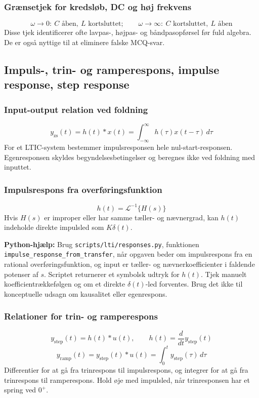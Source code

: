 \subsubsection{Grænsetjek for kredsløb, DC og høj frekvens}
\[
\omega\to0:\ C\text{ åben},\ L\text{ kortsluttet};\qquad
\omega\to\infty:\ C\text{ kortsluttet},\ L\text{ åben}
\]
Disse tjek identificerer ofte lavpas-, højpas- og båndpasopførsel før fuld algebra. De er også nyttige til at eliminere falske MCQ-svar.

\subsection{Impuls-, trin- og ramperespons, impulse response, step response}

\subsubsection{Input-output relation ved foldning}
\[
y_{\mathrm{zs}}(t)=h(t)*x(t)=\int_{-\infty}^{\infty}h(\tau)x(t-\tau)\,d\tau
\]
For et LTIC-system bestemmer impulsresponsen hele nul-start-responsen. Egenresponsen skyldes begyndelsesbetingelser og beregnes ikke ved foldning med inputtet.

\subsubsection{Impulsrespons fra overføringsfunktion}
\[
h(t)=\mathcal{L}^{-1}\{H(s)\}
\]
Hvis \(H(s)\) er improper eller har samme tæller- og nævnergrad, kan \(h(t)\) indeholde direkte impulsled som \(K\delta(t)\).

\textbf{Python-hjælp:} Brug \texttt{scripts/lti/responses.py}, funktionen \texttt{impulse\_response\_from\_transfer}, når opgaven beder om impulsrespons fra en rational overføringsfunktion, og input er tæller- og nævnerkoefficienter i faldende potenser af \(s\). Scriptet returnerer et symbolsk udtryk for \(h(t)\). Tjek manuelt koefficientrækkefølgen og om et direkte \(\delta(t)\)-led forventes. Brug det ikke til konceptuelle udsagn om kausalitet eller egenrespons.

\subsubsection{Relationer for trin- og ramperespons}
\[
y_{\mathrm{step}}(t)=h(t)*u(t),\qquad
h(t)=\frac{d}{dt}y_{\mathrm{step}}(t)
\]
\[
y_{\mathrm{ramp}}(t)=y_{\mathrm{step}}(t)*u(t)=\int_0^t y_{\mathrm{step}}(\tau)\,d\tau
\]
Differentier for at gå fra trinrespons til impulsrespons, og integrer for at gå fra trinrespons til ramperespons. Hold øje med impulsled, når trinresponsen har et spring ved \(0^+\).

